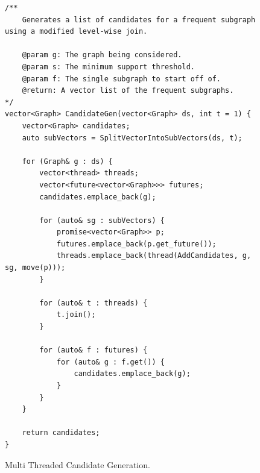 \documentclass{article}
\begin{document}
\begin{figure}
\begin{lstlisting}
/**
	Generates a list of candidates for a frequent subgraph using a modified level-wise join.

	@param g: The graph being considered.
	@param s: The minimum support threshold.
	@param f: The single subgraph to start off of.
	@return: A vector list of the frequent subgraphs.
*/
vector<Graph> CandidateGen(vector<Graph> ds, int t = 1) {
	vector<Graph> candidates;
	auto subVectors = SplitVectorIntoSubVectors(ds, t);

	for (Graph& g : ds) {
		vector<thread> threads;
		vector<future<vector<Graph>>> futures;
		candidates.emplace_back(g);

		for (auto& sg : subVectors) {
			promise<vector<Graph>> p;
			futures.emplace_back(p.get_future());
			threads.emplace_back(thread(AddCandidates, g, sg, move(p)));
		}

		for (auto& t : threads) {
			t.join();
		}

		for (auto& f : futures) {
			for (auto& g : f.get()) {
				candidates.emplace_back(g);
			}
		}
	}

	return candidates;
}
\end{lstlisting}
  \caption{Multi Threaded Candidate Generation.}
  \label{fig:Multi Threaded Candidate Generation}
\end{figure}
\end{document}
